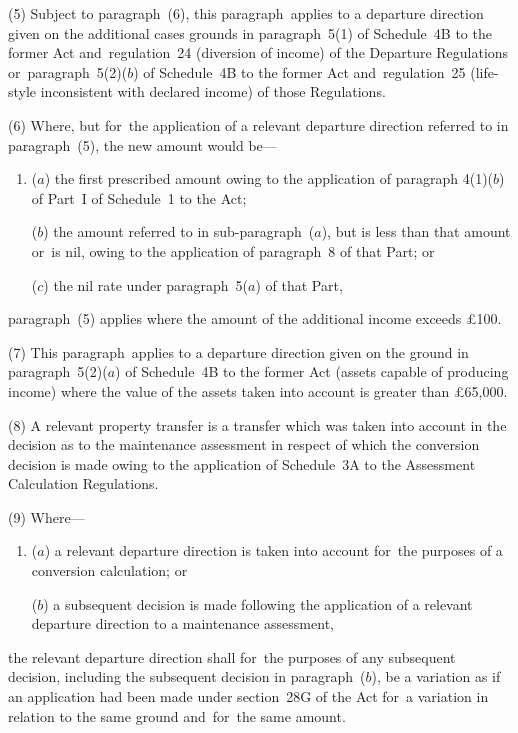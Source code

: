 \documentclass[12pt,a4paper]{article}
\begin{document}
(5) Subject to paragraph~(6), this paragraph~applies to a departure direction given on the additional cases grounds in paragraph~5(1) of Schedule~4B to the former Act and~regulation~24 (diversion of income) of the Departure Regulations or~paragraph~5(2)($b$)  of Schedule~4B to the former Act and~regulation~25 (life-style inconsistent with declared income) of those Regulations.


(6) Where, but for~the application of a relevant departure direction referred to in paragraph~(5), the new amount would be—
\begin{enumerate}\item[]
($a$) the first prescribed amount owing to the application of paragraph 4(1)($b$)  of Part~I of Schedule~1 to the Act;

($b$) the amount referred to in sub-paragraph~($a$), but is less than that amount or~is nil, owing to the application of paragraph~8 of that Part; or

($c$) the nil rate under paragraph~5($a$)  of that Part,
\end{enumerate}
paragraph~(5) applies where the amount of the additional income exceeds £100.

(7) This paragraph~applies to a departure direction given on the ground in paragraph~5(2)($a$)  of Schedule~4B to the former Act (assets capable of producing income) where the value of the assets taken into account is greater than £65,000.

(8) A relevant property transfer is a transfer which was taken into account in the decision as to the maintenance assessment in respect of which the conversion decision is made owing to the application of Schedule~3A to the Assessment Calculation Regulations.

(9) Where—
\begin{enumerate}\item[]
($a$) a relevant departure direction is taken into account for~the purposes of a conversion calculation; or

($b$) a subsequent decision is made following the application of a relevant departure direction to a maintenance assessment,
\end{enumerate}
the relevant departure direction shall for~the purposes of any subsequent decision, including the subsequent decision in paragraph~($b$), be a variation as if an application had been made under section~28G of the Act for~a variation in relation to the same ground and~for~the same amount.
\end{document}
